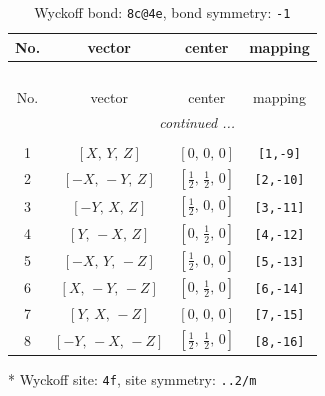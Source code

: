 \documentclass[fleqn,8pt]{jsarticle}
\begin{document}
\begin{longtable}{cccc}
\caption{Wyckoff bond: {\tt 8c@4e}, bond symmetry: {\tt -1}}
 \\
 \hline \hline
No. & vector & center & mapping \\ \hline \endfirsthead

\multicolumn{3}{l}{\tablename\ \thetable{}} \\
 \hline \hline
No. & vector & center & mapping \\ \hline \endhead

 \hline \hline
\multicolumn{3}{r}{\footnotesize\it continued ...} \\ \endfoot

 \hline \hline
\multicolumn{3}{r}{} \\ \endlastfoot

1 & $\left[ X,\, Y,\, Z \right]$ & $\left[ 0,\, 0,\, 0 \right]$ & {\tt [1,-9]} \\ \hline
2 & $\left[ - X,\, - Y,\, Z \right]$ & $\left[ \frac{1}{2},\, \frac{1}{2},\, 0 \right]$ & {\tt [2,-10]} \\ \hline
3 & $\left[ - Y,\, X,\, Z \right]$ & $\left[ \frac{1}{2},\, 0,\, 0 \right]$ & {\tt [3,-11]} \\ \hline
4 & $\left[ Y,\, - X,\, Z \right]$ & $\left[ 0,\, \frac{1}{2},\, 0 \right]$ & {\tt [4,-12]} \\ \hline
5 & $\left[ - X,\, Y,\, - Z \right]$ & $\left[ \frac{1}{2},\, 0,\, 0 \right]$ & {\tt [5,-13]} \\ \hline
6 & $\left[ X,\, - Y,\, - Z \right]$ & $\left[ 0,\, \frac{1}{2},\, 0 \right]$ & {\tt [6,-14]} \\ \hline
7 & $\left[ Y,\, X,\, - Z \right]$ & $\left[ 0,\, 0,\, 0 \right]$ & {\tt [7,-15]} \\ \hline
8 & $\left[ - Y,\, - X,\, - Z \right]$ & $\left[ \frac{1}{2},\, \frac{1}{2},\, 0 \right]$ & {\tt [8,-16]} \\
\end{longtable}
* Wyckoff site: {\tt 4f}, site symmetry: {\tt ..2/m}
\renewcommand{\arraystretch}{1.2}
\end{document}
